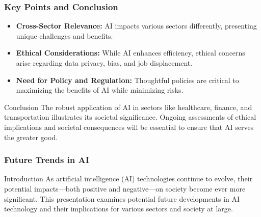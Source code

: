 \documentclass[aspectratio=169]{beamer}
\begin{document}
\begin{frame}[fragile]
    \frametitle{Key Points and Conclusion}
    \begin{itemize}
        \item \textbf{Cross-Sector Relevance:} AI impacts various sectors differently, presenting unique challenges and benefits.
        \item \textbf{Ethical Considerations:} While AI enhances efficiency, ethical concerns arise regarding data privacy, bias, and job displacement.
        \item \textbf{Need for Policy and Regulation:} Thoughtful policies are critical to maximizing the benefits of AI while minimizing risks.
    \end{itemize}

    \begin{block}{Conclusion}
        The robust application of AI in sectors like healthcare, finance, and transportation illustrates its societal significance. 
        Ongoing assessments of ethical implications and societal consequences will be essential to ensure that AI serves the greater good.
    \end{block}
\end{frame}

\begin{frame}[fragile]
    \frametitle{Future Trends in AI}
    \begin{block}{Introduction}
        As artificial intelligence (AI) technologies continue to evolve, their potential impacts—both positive and negative—on society become ever more significant. This presentation examines potential future developments in AI technology and their implications for various sectors and society at large.
    \end{block}
\end{frame}
\end{document}

